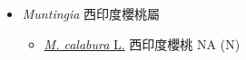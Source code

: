 
  \begin{itemize}
 \item[] \textit{Muntingia} 西印度櫻桃屬
                                
  \begin{itemize}
        \item[] \href{http://www.theplantlist.org/tpl1.1/search?q=Muntingia+calabura}{\textit{M. calabura} L.}   西印度櫻桃   NA (N)
  \end{itemize}
  \end{itemize}

